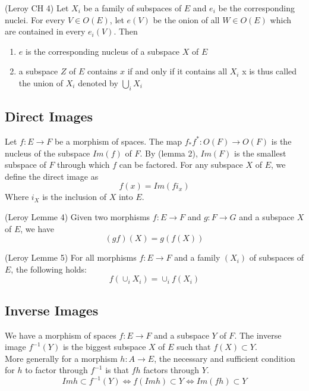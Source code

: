 \begin{lemma}
(Leroy CH 4)
    \label{lem:family_of_subspaces}
    Let $X_i$ be a family of subspaces of $E$ and $e_i$ be the corresponding nuclei. For every $V \in O(E)$, let $e(V)$ be the onion of all $W \in O(E)$ which are contained in every $e_i(V)$. Then \\
    \begin{enumerate}
        \item $e$ is the corresponding nucleus of a subspace $X$ of $E$
        \item a subspace $Z$ of $E$ contains $x$ if and only if it contains all $X_i$ x is thus called the union of $X_i$ denoted by $\bigcup_i X_i$
    \end{enumerate}
\end{lemma}

\subsection{Direct Images}
\begin{definition}
    \label{def:direct_images}
    Let $f : E \rightarrow F$ be a morphism of spaces. The map $f_*f^* : O(F) \to O(F)$ is the nucleus of the subspace $Im(f)$ of $F$. By (lemma 2), $Im(F)$ is the smallest subspace of $F$ through which $f$ can be factored. For any subspace $X$ of $E$, we define the direct image as
    \[f(x) = Im(fi_x)\]
    Where $i_X$ is the inclusion of $X$ into $E$.
\end{definition}

\begin{lemma}
(Leroy Lemme 4)
    \label{lem:direct_images_transitive}
    Given two morphisms $f : E \rightarrow F$ and $g : F \rightarrow G$ and a subspace $X$ of $E$, we have
    \[(gf)(X) = g(f(X))\]
\end{lemma}

\begin{lemma}
(Leroy Lemme 5)
    \label{lem:direct_images_families}
    For all morphisms $f: E \rightarrow F$ and a family $(X_i)$ of subspaces of $E$, the following holds:
    \[f(\cup_i X_i) = \cup_i f(X_i)\]
\end{lemma}

\subsection{Inverse Images}
\begin{definition}
    \label{def:inverse_images}
    We have a morphism of spaces $f : E \rightarrow F$ and a subspace $Y$ of $F$. The inverse image $f^{-1}(Y)$ is the biggest subspace $X$ of $E$ such that $f(X) \subset Y$. \\
    More generally for a morphism $h : A \rightarrow E$, the necessary and sufficient condition for $h$ to factor through $f^{-1}$ is that $fh$ factors through $Y$.
    \[Im h \subset f^{-1}(Y)\iff f(Im h) \subset Y \iff Im(fh) \subset Y \] \
\end{definition}

